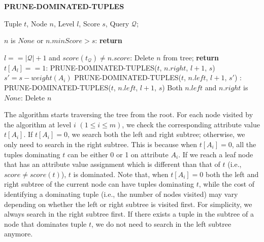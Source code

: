 \begin{algorithm}[htb]
\caption{{\bf PRUNE-DOMINATED-TUPLES}}
\begin{algorithmic}[1]
\label{alg:pruneDominatedTuples}
 Tuple $t$, Node $n$, Level $l$, Score $s$, Query $\mathcal{Q}$;

 $n$ is $None$ or $n.minScore > s$: {\bf return}

 $l == |\mathcal{Q}| + 1$ and $score(t_{\mathcal{Q}}) \neq n.score$:
    \STATE \hindent Delete $n$ from tree; {\bf return}
 $t[A_l] == 1$:
    \STATE \hindent PRUNE-DOMINATED-TUPLES($t$, $n.right$, $l+1$, $s$)
    \STATE \hindent $s' = s - weight(A_i)$
    \STATE \hindent PRUNE-DOMINATED-TUPLES($t$, $n.left$, $l+1$, $s'$)
: PRUNE-DOMINATED-TUPLES($t$, $n.left$, $l+1$, $s$)
 Both $n.left$ and $n.right$ is $None$: Delete $n$
\end{algorithmic}
\end{algorithm}


\vspace{1mm}
 The algorithm starts traversing the tree from the root. For each node visited by the algorithm at level $i$ $(1 \leq i \leq m)$, we check the corresponding attribute value $t[A_i]$. If $t[A_i] = 0$, we search both the left and right subtree; otherwise, we only need to search in the right subtree. This is because when $t[A_i] = 0$, all the tuples dominating $t$ can be either 0 or 1 on attribute $A_i$. If we reach a leaf node that has an attribute value assignment which is different than that of $t$ (i.e., $score \neq score(t)$), $t$ is dominated.  Note that, when $t[A_i] = 0$ both the left and right subtree of the current node can have tuples dominating $t$, while the cost of identifying a dominating tuple (i.e., the number of nodes visited) may vary depending on whether the left or right subtree is visited first. For simplicity, we always search in the right subtree first. If there exists a tuple in the subtree of a node that dominates tuple $t$, we do not need to search in the left subtree anymore. 


